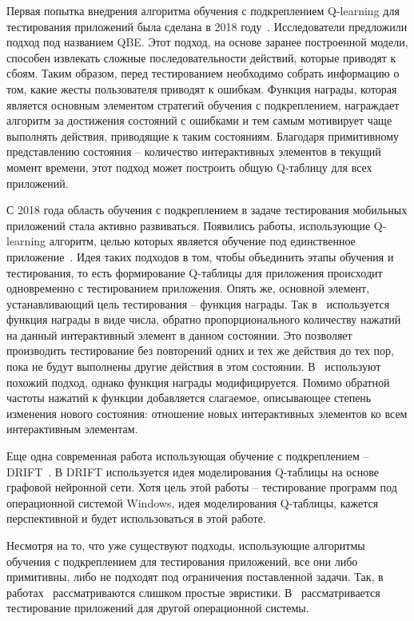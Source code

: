Первая попытка внедрения алгоритма обучения с подкреплением Q-learning для тестирования приложений была сделана в 2018 году~\cite{koroglu2018qbe}. Исследователи предложили подход под названием QBE. Этот подход, на основе заранее построенной модели, способен извлекать сложные последовательности действий, которые приводят к сбоям. Таким образом, перед тестированием необходимо собрать информацию о том, какие жесты пользователя приводят к ошибкам. Функция награды, которая является основным элементом стратегий обучения с подкреплением, награждает алгоритм за достижения состояний с ошибками и тем самым мотивирует чаще выполнять действия, приводящие к таким состояниям. Благодаря примитивному представлению состояния -- количество интерактивных элементов в текущий момент времени, этот подход может построить общую Q-таблицу для всех приложений. 

С 2018 года область обучения с подкреплением в задаче тестирования мобильных приложений стала активно развиваться. Появились работы, использующие Q-learning алгоритм, целью которых является обучение под единственное приложение~\cite{adamo2018reinforcement, vuong2018reinforcement}. Идея таких подходов в том, чтобы объединить этапы обучения и тестирования, то есть формирование Q-таблицы для приложения происходит одновременно с тестированием приложения. Опять же, основной элемент, устанавливающий цель тестирования -- функция награды. Так в~\cite{adamo2018reinforcement} используется функция награды в виде числа, обратно пропорционального количеству нажатий на данный интерактивный элемент в данном состоянии. Это позволяет производить тестирование без повторений одних и тех же действия до тех пор, пока не будут выполнены другие действия в этом состоянии. В~\cite{vuong2018reinforcement} используют похожий подход, однако функция награды модифицируется. Помимо обратной частоты нажатий к функции добавляется слагаемое, описывающее степень изменения нового состояния: отношение новых интерактивных элементов ко всем интерактивным элементам.

Еще одна современная работа использующая обучение с подкреплением -- DRIFT~\cite{harries2020drift}. В DRIFT используется идея моделирования Q-таблицы на основе графовой нейронной сети. Хотя цель этой работы -- тестирование программ под операционной системой Windows, идея моделирования Q-таблицы, кажется перспективной и будет использоваться в этой работе. 

Несмотря на то, что уже существуют подходы, использующие алгоритмы обучения с подкреплением для тестирования приложений, все они либо примитивны, либо не подходят под ограничения поставленной задачи. Так, в работах~\cite{koroglu2018qbe, adamo2018reinforcement} рассматриваются слишком простые эвристики. В~\cite{harries2020drift} рассматривается тестирование приложений для другой операционной системы. 